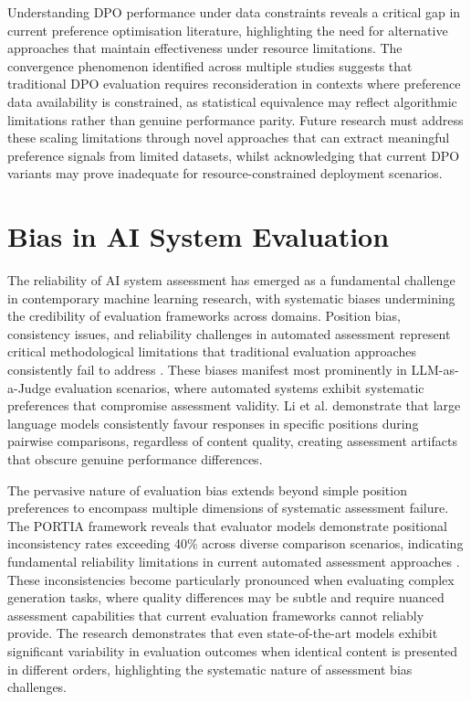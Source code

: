 Understanding DPO performance under data constraints reveals a critical gap in current preference optimisation literature, highlighting the need for alternative approaches that maintain effectiveness under resource limitations. The convergence phenomenon identified across multiple studies suggests that traditional DPO evaluation requires reconsideration in contexts where preference data availability is constrained, as statistical equivalence may reflect algorithmic limitations rather than genuine performance parity. Future research must address these scaling limitations through novel approaches that can extract meaningful preference signals from limited datasets, whilst acknowledging that current DPO variants may prove inadequate for resource-constrained deployment scenarios.

\section{Bias in AI System Evaluation}

The reliability of AI system assessment has emerged as a fundamental challenge in contemporary machine learning research, with systematic biases undermining the credibility of evaluation frameworks across domains. Position bias, consistency issues, and reliability challenges in automated assessment represent critical methodological limitations that traditional evaluation approaches consistently fail to address \cite{li2023position_bias_portia}. These biases manifest most prominently in LLM-as-a-Judge evaluation scenarios, where automated systems exhibit systematic preferences that compromise assessment validity. Li et al. demonstrate that large language models consistently favour responses in specific positions during pairwise comparisons, regardless of content quality, creating assessment artifacts that obscure genuine performance differences.

The pervasive nature of evaluation bias extends beyond simple position preferences to encompass multiple dimensions of systematic assessment failure. The PORTIA framework reveals that evaluator models demonstrate positional inconsistency rates exceeding 40\% across diverse comparison scenarios, indicating fundamental reliability limitations in current automated assessment approaches \cite{li2023position_bias_portia}. These inconsistencies become particularly pronounced when evaluating complex generation tasks, where quality differences may be subtle and require nuanced assessment capabilities that current evaluation frameworks cannot reliably provide. The research demonstrates that even state-of-the-art models exhibit significant variability in evaluation outcomes when identical content is presented in different orders, highlighting the systematic nature of assessment bias challenges.

